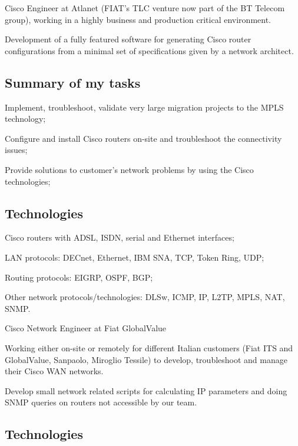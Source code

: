 \noindent
Cisco Engineer at Atlanet (FIAT's TLC venture now part of the BT Telecom group), 
working in a highly business and production critical environment.

Development of a fully featured software for generating Cisco router
configurations from a minimal set of specifications given by a network architect.

\subsection{Summary of my tasks}

\item{\bdot} Implement, troubleshoot, validate very large migration projects
   to the MPLS technology;
\item{\bdot} Configure and install Cisco routers on-site and troubleshoot the
   connectivity issues;
\item{\bdot} Provide solutions to customer's network problems by using the Cisco
   technologies;

\subsection{Technologies}

\item{\bdot} Cisco routers with ADSL, ISDN, serial and Ethernet interfaces;
\item{\bdot} LAN protocols: DECnet, Ethernet, IBM SNA, TCP, Token Ring, UDP;
\item{\bdot} Routing protocols: EIGRP, OSPF, BGP;
\item{\bdot} Other network protocols/technologies: DLSw, ICMP, IP, L2TP, 
   MPLS, NAT, SNMP.


\bigskip
{}
   {Cisco Network Engineer at Fiat GlobalValue}

\noindent
Working either on-site or remotely for different Italian customers (Fiat ITS
and GlobalValue, Sanpaolo, Miroglio Tessile) to develop, troubleshoot and
manage their Cisco WAN networks.

Develop small network related scripts for calculating IP parameters and doing
SNMP queries on routers not accessible by our team.

\subsection{Technologies}

